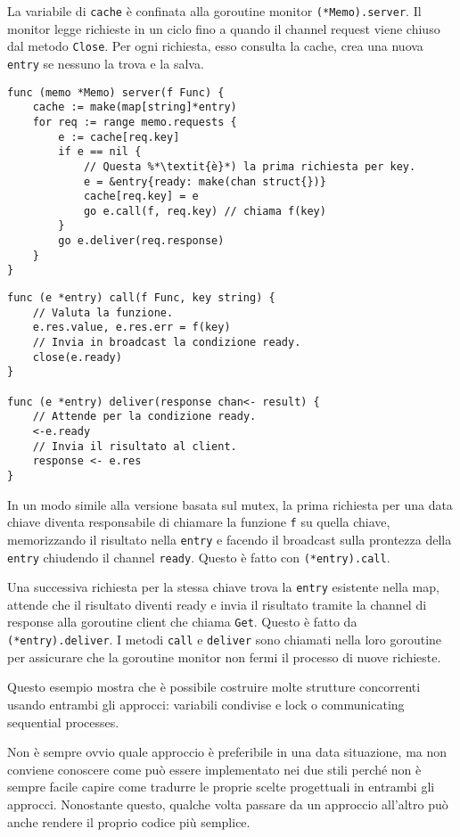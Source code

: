 \documentclass[../../thesis.tex]{subfiles}
\begin{document}
    La variabile di \verb"cache" è confinata alla goroutine monitor \verb"(*Memo).server".
    Il monitor legge richieste in un ciclo fino a quando il channel request viene chiuso dal metodo \verb"Close".
    Per ogni richiesta, esso consulta la cache, crea una nuova \verb"entry" se nessuno la trova e la salva.
    \begin{lstlisting}[frame = single, label = {lst:lstlisting9-7.11}]
func (memo *Memo) server(f Func) {
    cache := make(map[string]*entry)
    for req := range memo.requests {
        e := cache[req.key]
        if e == nil {
            // Questa %*\textit{è}*) la prima richiesta per key.
            e = &entry{ready: make(chan struct{})}
            cache[req.key] = e
            go e.call(f, req.key) // chiama f(key)
        }
        go e.deliver(req.response)
    }
}
    \end{lstlisting}
    \clearpage
    \newpage
    \begin{lstlisting}[frame = single, label = {lst:lstlisting9-7.12}]
func (e *entry) call(f Func, key string) {
    // Valuta la funzione.
    e.res.value, e.res.err = f(key)
    // Invia in broadcast la condizione ready.
    close(e.ready)
}

func (e *entry) deliver(response chan<- result) {
    // Attende per la condizione ready.
    <-e.ready
    // Invia il risultato al client.
    response <- e.res
}
    \end{lstlisting}
    In un modo simile alla versione basata sul mutex, la prima richiesta per una data chiave diventa responsabile di chiamare la funzione \verb"f" su quella chiave, memorizzando il risultato nella \verb"entry" e facendo il broadcast sulla prontezza della \verb"entry" chiudendo il channel \verb"ready".
    Questo è fatto con \verb"(*entry).call".
    \hfill \vspace{12pt}

    Una successiva richiesta per la stessa chiave trova la \verb"entry" esistente nella map, attende che il risultato diventi ready e invia il risultato tramite la channel di response alla goroutine client che chiama \verb"Get".
    Questo è fatto da \verb"(*entry).deliver".
    I metodi \verb"call" e \verb"deliver" sono chiamati nella loro goroutine per assicurare che la goroutine monitor non fermi il processo di nuove richieste.
    \hfill \vspace{12pt}

    Questo esempio mostra che è possibile costruire molte strutture concorrenti usando entrambi gli approcci: variabili condivise e lock o communicating sequential processes.
    \hfill \vspace{12pt}

    Non è sempre ovvio quale approccio è preferibile in una data situazione, ma non conviene conoscere come può essere implementato nei due stili perché non è sempre facile capire come tradurre le proprie scelte progettuali in entrambi gli approcci.
    Nonostante questo, qualche volta passare da un approccio all'altro può anche rendere il proprio codice più semplice.
\end{document}
